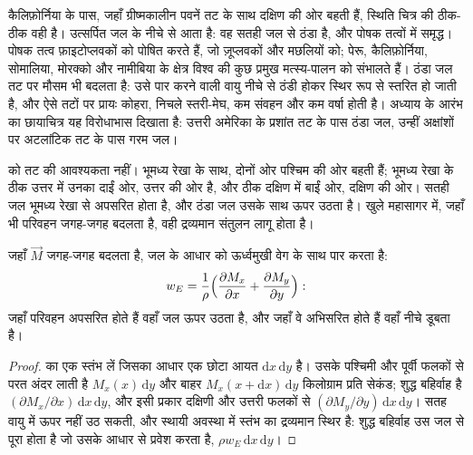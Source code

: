 
कैलिफ़ोर्निया के पास, जहाँ ग्रीष्मकालीन पवनें तट के साथ दक्षिण की ओर बहती हैं, स्थिति चित्र की ठीक-ठीक वही है। उत्सर्पित जल  के नीचे से आता है: वह सतही जल से ठंडा है, और पोषक तत्वों में समृद्ध। पोषक तत्व फ़ाइटोप्लवकों को पोषित करते हैं, जो ज़ूप्लवकों और मछलियों को; पेरू, कैलिफ़ोर्निया, सोमालिया, मोरक्को और नामीबिया के  क्षेत्र विश्व की कुछ प्रमुख मत्स्य-पालन को संभालते हैं। ठंडा जल तट पर मौसम भी बदलता है: उसे पार करने वाली वायु नीचे से ठंडी होकर स्थिर रूप से स्तरित हो जाती है, और ऐसे तटों पर प्रायः कोहरा, निचले स्तरी-मेघ, कम संवहन और कम वर्षा होती है। अध्याय के आरंभ का छायाचित्र यह विरोधाभास दिखाता है: उत्तरी अमेरिका के प्रशांत तट के पास ठंडा जल, उन्हीं अक्षांशों पर अटलांटिक तट के पास गरम जल।

 को तट की आवश्यकता नहीं। भूमध्य रेखा के साथ,  दोनों ओर पश्चिम की ओर बहती हैं; भूमध्य रेखा के ठीक उत्तर में उनका  दाईं ओर, उत्तर की ओर है, और ठीक दक्षिण में बाईं ओर, दक्षिण की ओर। सतही जल भूमध्य रेखा से अपसरित होता है, और ठंडा जल उसके साथ ऊपर उठता है। खुले महासागर में, जहाँ भी परिवहन जगह-जगह बदलता है, वही द्रव्यमान संतुलन लागू होता है।

\begin{proposition}[एकमान पंपिंग]\label{prop:b1:ocean-circulation:pumping}
जहाँ  $\vec M$ जगह-जगह बदलता है, जल  के आधार को ऊर्ध्वमुखी वेग
के साथ पार करता है:
\[
  w_E = \frac{1}{\rho}\Bigl(\frac{\partial M_x}{\partial x} + \frac{\partial M_y}{\partial y}\Bigr):
\]
जहाँ परिवहन अपसरित होते हैं वहाँ जल ऊपर उठता है, और जहाँ वे अभिसरित होते हैं वहाँ नीचे डूबता है।
\end{proposition}

\begin{proof}
 का एक स्तंभ लें जिसका आधार एक छोटा आयत $\mathrm dx\,\mathrm
dy$ है। उसके पश्चिमी और पूर्वी फलकों से परत अंदर लाती है $M_x(x)\,\mathrm dy$ और बाहर $M_x(x + \mathrm dx)\,\mathrm dy$ किलोग्राम प्रति सेकंड; शुद्ध बहिर्वाह है
$(\partial M_x/\partial x)\,\mathrm dx\,\mathrm dy$, और इसी प्रकार दक्षिणी और उत्तरी फलकों से
$(\partial M_y/\partial y)\,\mathrm dx\,\mathrm dy$। सतह वायु में ऊपर नहीं उठ सकती, और स्थायी अवस्था में स्तंभ का द्रव्यमान स्थिर है: शुद्ध बहिर्वाह उस जल से पूरा होता है जो उसके आधार से प्रवेश करता है, $\rho w_E\,\mathrm dx\,\mathrm dy$।
\end{proof}

